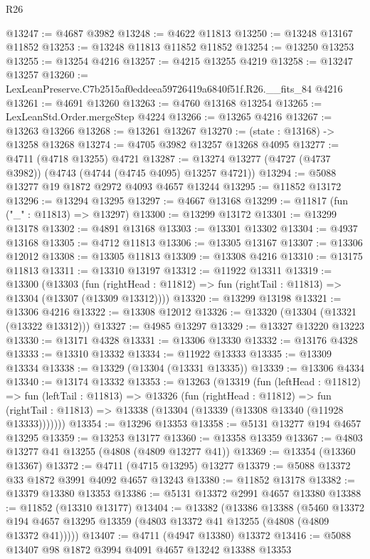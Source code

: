 \begin{lexlean}{R26}
\begin{coremodule}
@13247 := @4687 @3982
@13248 := @4622 @11813
@13250 := @13248 @13167 @11852
@13253 := @13248 @11813 @11852 @11852
@13254 := @13250 @13253
@13255 := @13254 @4216
@13257 := @4215 @13255 @4219
@13258 := @13247 @13257
@13260 := LexLeanPreserve.C7b2515af0eddeea59726419a6840f51f.R26.__fits_84 @4216
@13261 := @4691 @13260
@13263 := @4760 @13168 @13254
@13265 := LexLeanStd.Order.mergeStep @4224
@13266 := @13265 @4216
@13267 := @13263 @13266
@13268 := @13261 @13267
@13270 := (state : @13168) -> @13258 @13268
@13274 := @4705 @3982 @13257 @13268 @4095
@13277 := @4711 (@4718 @13255) @4721
@13287 := @13274 @13277 (@4727 (@4737 @3982)) (@4743 (@4744 (@4745 @4095) @13257 @4721))
@13294 := @5088 @13277 @19 @1872 @2972 @4093 @4657 @13244
@13295 := @11852 @13172
@13296 := @13294 @13295
@13297 := @4667 @13168
@13299 := @11817 (fun ("_" : @11813) => @13297)
@13300 := @13299 @13172
@13301 := @13299 @13178
@13302 := @4891 @13168
@13303 := @13301 @13302
@13304 := @4937 @13168
@13305 := @4712 @11813
@13306 := @13305 @13167
@13307 := @13306 @12012
@13308 := @13305 @11813
@13309 := @13308 @4216
@13310 := @13175 @11813
@13311 := @13310 @13197
@13312 := @11922 @13311
@13319 := @13300
    (@13303
      (fun (rightHead : @11812) => fun (rightTail : @11813) => @13304 (@13307 (@13309 @13312))))
@13320 := @13299 @13198
@13321 := @13306 @4216
@13322 := @13308 @12012
@13326 := @13320 (@13304 (@13321 (@13322 @13312)))
@13327 := @4985 @13297
@13329 := @13327 @13220 @13223
@13330 := @13171 @4328
@13331 := @13306 @13330
@13332 := @13176 @4328
@13333 := @13310 @13332
@13334 := @11922 @13333
@13335 := @13309 @13334
@13338 := @13329 (@13304 (@13331 @13335))
@13339 := @13306 @4334
@13340 := @13174 @13332
@13353 := @13263
    (@13319
      (fun (leftHead : @11812) =>
      fun (leftTail : @11813) =>
      @13326
        (fun (rightHead : @11812) =>
        fun (rightTail : @11813) => @13338 (@13304 (@13339 (@13308 @13340 (@11928 @13333)))))))
@13354 := @13296 @13353
@13358 := @5131 @13277 @194 @4657 @13295
@13359 := @13253 @13177
@13360 := @13358 @13359
@13367 := @4803 @13277 @41 @13255 (@4808 (@4809 @13277 @41))
@13369 := @13354 (@13360 @13367)
@13372 := @4711 (@4715 @13295) @13277
@13379 := @5088 @13372 @33 @1872 @3991 @4092 @4657 @13243
@13380 := @11852 @13178
@13382 := @13379 @13380 @13353
@13386 := @5131 @13372 @2991 @4657 @13380
@13388 := @11852 (@13310 @13177)
@13404 := @13382
    (@13386
      @13388
      (@5460 @13372 @194 @4657 @13295 @13359 (@4803 @13372 @41 @13255 (@4808 (@4809 @13372 @41)))))
@13407 := @4711 (@4947 @13380) @13372
@13416 := @5088 @13407 @98 @1872 @3994 @4091 @4657 @13242 @13388 @13353

\end{coremodule}
\end{lexlean}
